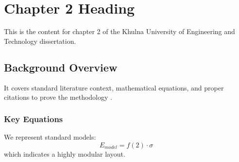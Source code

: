 \chapter{Chapter 2 Heading}
\label{ch:chapter2}
This is the content for chapter 2 of the Khulna University of Engineering and Technology dissertation.

\section{Background Overview}
It covers standard literature context, mathematical equations, and proper citations to prove the methodology \cite{texbook}.

\subsection{Key Equations}
We represent standard models:
\begin{equation}
    E_{model} = f(2) \cdot \sigma
\end{equation}
which indicates a highly modular layout.
